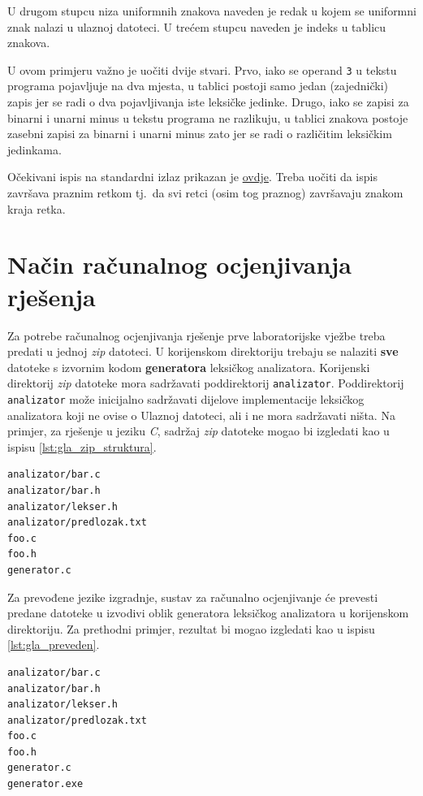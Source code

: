 \documentclass[times, 12pt, utf8]{book}
\begin{document}
U drugom stupcu niza uniformnih znakova naveden je redak u kojem se uniformni znak nalazi u ulaznoj datoteci.
U trećem stupcu naveden je indeks u tablicu znakova.

U ovom primjeru važno je uočiti dvije stvari.
Prvo, iako se operand \verb|3| u tekstu programa pojavljuje na dva mjesta, u tablici postoji samo jedan (zajednički) zapis jer se radi o dva pojavljivanja iste leksičke jedinke.
Drugo, iako se zapisi za binarni i unarni minus u tekstu programa ne razlikuju, u tablici znakova postoje zasebni zapisi za binarni i unarni minus zato jer se radi o različitim leksičkim jedinkama.

Očekivani ispis na standardni izlaz prikazan je \href{https://github.com/fer-ppj/ppj-labosi/raw/master/res/lab1/minus_primjer_izlaz.txt}{ovdje}.
Treba uočiti da ispis završava praznim retkom tj.~da svi retci (osim tog praznog) završavaju znakom kraja retka.

\section{Način računalnog ocjenjivanja rješenja}
Za potrebe računalnog ocjenjivanja rješenje prve laboratorijske vježbe treba predati u jednoj \emph{zip} datoteci.
U korijenskom direktoriju trebaju se nalaziti \textbf{sve} datoteke s izvornim kodom \textbf{generatora} leksičkog analizatora.
Korijenski direktorij \emph{zip} datoteke mora sadržavati poddirektorij \texttt{analizator}.
Poddirektorij \texttt{analizator} može inicijalno sadržavati dijelove implementacije leksičkog analizatora koji ne ovise o Ulaznoj datoteci, ali i ne mora sadržavati ništa.
Na primjer, za rješenje u jeziku \emph{C}, sadržaj \emph{zip} datoteke mogao bi izgledati kao u ispisu \ref{lst:gla_zip_struktura}.

\begin{lstlisting}[caption={Primjer sadržaja \emph{zip} datoteke. Imena datoteka \emph{nisu važna}.},label=lst:gla_zip_struktura]
analizator/bar.c
analizator/bar.h
analizator/lekser.h
analizator/predlozak.txt
foo.c
foo.h
generator.c
\end{lstlisting}

Za prevođene jezike izgradnje, sustav za računalno ocjenjivanje će prevesti predane datoteke u izvodivi oblik generatora leksičkog analizatora u korijenskom direktoriju.
Za prethodni primjer, rezultat bi mogao izgledati kao u ispisu \ref{lst:gla_preveden}.

\begin{lstlisting}[caption={Primjer sadržaja korijenskog direktorija nakon prevođenja generatora.},label=lst:gla_preveden]
analizator/bar.c
analizator/bar.h
analizator/lekser.h
analizator/predlozak.txt
foo.c
foo.h
generator.c
generator.exe
\end{lstlisting}
\end{document}
